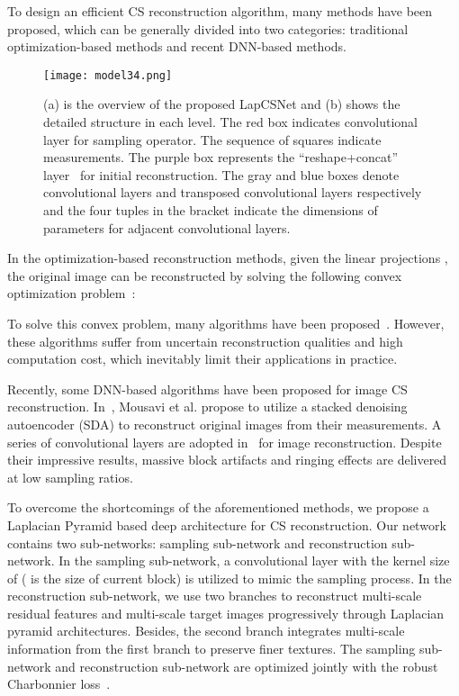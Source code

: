 \documentclass{article}
\begin{document}
To design an efficient CS reconstruction algorithm, many methods have been proposed, which can be generally divided into two categories: traditional optimization-based methods and recent DNN-based methods.

\begin{figure*}[!t]
\centering
\texttt{[image: model34.png]}
\caption{(a) is the overview of the proposed LapCSNet and (b) shows the detailed structure in each level. The red box indicates convolutional layer for sampling operator. The sequence of squares indicate measurements. The purple box represents the ``reshape+concat'' layer~\cite{shi2017deep} for initial reconstruction. The gray and blue boxes denote convolutional layers and transposed convolutional layers respectively and the four tuples in the bracket indicate the dimensions of parameters for adjacent convolutional layers.}
\label{figure1}
\end{figure*}



In the optimization-based reconstruction methods, given the linear projections , the original image  can be reconstructed by solving the following convex optimization problem~\cite{candes2006robust, donoho2006compressed}:

To solve this convex problem, many algorithms have been proposed~\cite{chen2001atomic, li1tval3, zhang2014group}. However, these algorithms suffer from uncertain reconstruction qualities and high computation cost, which inevitably limit their applications in practice.

Recently, some DNN-based algorithms have been proposed for image CS reconstruction. In~\cite{mousavi2015deep}, Mousavi et al. propose to utilize a stacked denoising autoencoder (SDA) to reconstruct original images from their measurements. A series of convolutional layers are adopted in~\cite{kulkarni2016reconnet,adler2016deep,shi2017deep} for image reconstruction. Despite their impressive results, massive block artifacts and ringing effects are delivered at low sampling ratios.

To overcome the shortcomings of the aforementioned methods, we propose a Laplacian Pyramid based deep architecture for CS reconstruction. Our network contains two sub-networks: sampling sub-network and reconstruction sub-network. In the sampling sub-network, a convolutional layer with the kernel size of  ( is the size of current block) is utilized to mimic the sampling process. In the reconstruction sub-network, we use two branches to reconstruct multi-scale residual features and multi-scale target images progressively through Laplacian pyramid architectures. Besides, the second branch integrates multi-scale information from the first branch to preserve finer textures. The sampling sub-network and reconstruction sub-network are optimized jointly with the robust Charbonnier loss~\cite{bruhn2005lucas}.
\end{document}
